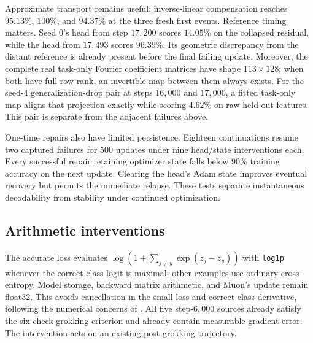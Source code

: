 Approximate transport remains useful: inverse-linear compensation reaches $95.13\%$, $100\%$, and $94.37\%$ at the three fresh first events. Reference timing matters. Seed $0$'s head from step $17{,}200$ scores $14.05\%$ on the collapsed residual, while the head from $17{,}493$ scores $96.39\%$. Its geometric discrepancy from the distant reference is already present before the final failing update. Moreover, the complete real task-only Fourier coefficient matrices have shape $113\times128$; when both have full row rank, an invertible map between them always exists. For the seed-$4$ generalization-drop pair at steps $16{,}000$ and $17{,}000$, a fitted task-only map aligns that projection exactly while scoring $4.62\%$ on raw held-out features. This pair is separate from the adjacent failures above.

One-time repairs also have limited persistence. Eighteen continuations resume two captured failures for $500$ updates under nine head/state interventions each. Every successful repair retaining optimizer state falls below $90\%$ training accuracy on the next update. Clearing the head's Adam state improves eventual recovery but permits the immediate relapse. These tests separate instantaneous decodability from stability under continued optimization.

\subsection{Arithmetic interventions}
\label{app:arithmetic}

The accurate loss evaluates $\log(1+\sum_{j\ne y}\exp(z_j-z_y))$ with \texttt{log1p} whenever the correct-class logit is maximal; other examples use ordinary cross-entropy. Model storage, backward matrix arithmetic, and Muon's update remain float32. This avoids cancellation in the small loss and correct-class derivative, following the numerical concerns of \citet{prieto2025grokking}. All five step-$6{,}000$ sources already satisfy the six-check grokking criterion and already contain measurable gradient error. The intervention acts on an existing post-grokking trajectory.

